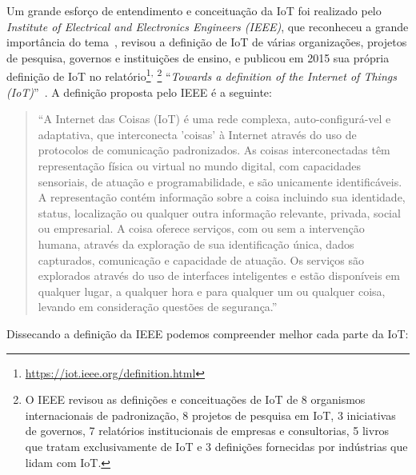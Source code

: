 \documentclass[pdftex, brazil, 12pt, twoside]{article}
\newcommand{\ingles}[1]{\textit{#1}}
\begin{document}
Um grande esforço de entendimento e conceituação da IoT foi realizado pelo \ingles{Institute
  of Electrical and Electronics Engineers (IEEE)}, que reconheceu a grande importância
do tema~\citep{IEEEIoTReport}, revisou a definição de IoT
de várias organizações, projetos de pesquisa, governos e instituições de ensino, e publicou
em 2015 sua própria definição de IoT no
relatório\footnote{\url{https://iot.ieee.org/definition.html}}\textsuperscript{, }\footnote{O IEEE revisou
  as definições e conceituações de IoT de 8 organismos internacionais de padronização, 8 projetos
  de pesquisa em IoT, 3 iniciativas de governos, 7 relatórios institucionais de empresas e
  consultorias, 5 livros que tratam exclusivamente de IoT e 3 definições fornecidas por indústrias
que lidam com IoT.}
``\ingles{Towards a definition of
  the Internet of Things (IoT)}''~\citep{IEEEIoTDefinition}. A definição proposta
pelo IEEE é a seguinte:

\begin{quote}
  ``A Internet das Coisas (IoT) é uma rede complexa, auto-configurá-vel e adaptativa,
  que interconecta 'coisas' à Internet através do uso de protocolos de comunicação
  padronizados. As coisas interconectadas têm representação física ou virtual no mundo
  digital, com capacidades sensoriais, de atuação e programabilidade, e são unicamente
  identificáveis. A representação contém informação sobre a coisa incluindo sua identidade,
  status, localização ou qualquer outra informação relevante, privada, social ou
  empresarial. A coisa oferece serviços, com ou sem a intervenção humana, através
  da exploração de sua identificação única, dados capturados, comunicação e capacidade
  de atuação. Os serviços são explorados através do uso de interfaces inteligentes e
  estão disponíveis em qualquer lugar, a qualquer hora e para qualquer um ou qualquer
  coisa, levando em consideração questões de segurança.''~\citep[][p.\ 74]{IEEEIoTDefinition}
\end{quote}

Dissecando a definição da IEEE podemos compreender melhor cada parte da IoT:
\end{document}
